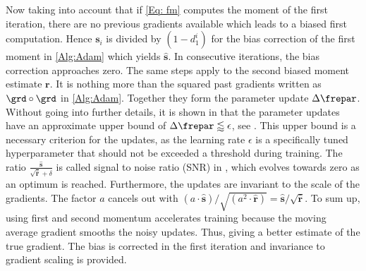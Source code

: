 Now taking into account that if \cref{Eq: fm} computes the moment of the first iteration, there are no previous gradients available which leads to a biased first computation. Hence \(\mathbf{s}_i\) is divided by \((1-d_1^i)\) for the bias correction of the first moment in \cref{Alg:Adam} which yields \(\hat{\mathbf{s}}\). In consecutive iterations, the bias correction approaches zero. The same steps apply to the second biased moment estimate \(\mathbf{r}\). It is nothing more than the squared past gradients written as \(\grd \circ\grd\) in \cref{Alg:Adam}. Together they form the parameter update \(\Delta\frepar\). Without going into further details, it is shown in  \cite{kingma2017adam} that the parameter updates have an approximate upper bound of  \(\Delta\frepar\lessapprox \epsilon\), see \cite{kingma2017adam}. This upper bound is a necessary criterion for the updates, as the learning rate \(\epsilon\) is a specifically tuned hyperparameter that should not be exceeded a threshold during training. The ratio  \(\frac{\hat{\mathbf{s}}}{\sqrt{\hat{\mathbf{r}}}+\delta}\) is called signal to noise ratio (SNR) in \cite{kingma2017adam}, which evolves towards zero as an optimum is reached. Furthermore, the updates are invariant to the scale of the gradients. The factor \(a\) cancels out with \((a\cdot\hat{\mathbf{s}})/\sqrt{(a^2\cdot\hat{\mathbf{r}})}=\hat{\mathbf{s}}/\sqrt{\hat{\mathbf{r}}}\). To sum up, using first and second momentum accelerates training because the moving average gradient smooths the noisy updates. Thus, giving a better estimate of the true gradient. The bias is corrected in the first iteration and invariance to gradient scaling is provided.\\       
